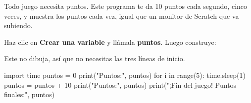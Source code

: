
Todo juego necesita puntos. Este programa te da 10 puntos cada segundo, cinco veces, y muestra los puntos cada vez, igual que un monitor de Scratch que va subiendo.

\noindent\begin{minipage}[t]{0.58\linewidth}\vspace{0pt}
\begin{scratch}[scale=0.95]
\end{scratch}
\end{minipage}\hfill\begin{minipage}[t]{0.33\linewidth}\vspace{0pt}
Haz clic en \textbf{Crear una variable} y llámala \textbf{puntos}. Luego construye:
\end{minipage}


Este no dibuja, así que no necesitas las tres líneas de inicio.

\begin{typethis}
import time
puntos = 0
print("Puntos:", puntos)
for i in range(5):
    time.sleep(1)
    puntos = puntos + 10
    print("Puntos:", puntos)
print("¡Fin del juego! Puntos finales:", puntos)
\end{typethis}


